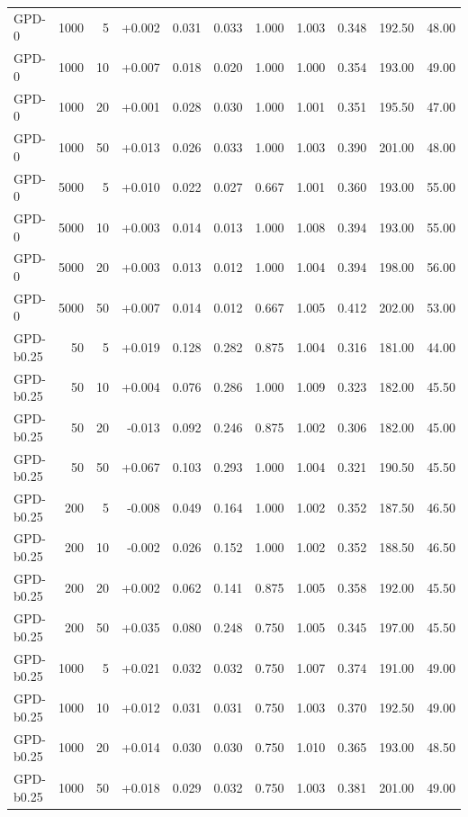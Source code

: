 \begin{table}[t]
\begin{tabular}{lrrrrrrrrrr}
GPD-0 & 1000 &    5 & +0.002 & 0.031 & 0.033 & 1.000 & 1.003 & 0.348 & 192.50 & 48.00 \\
GPD-0 & 1000 &   10 & +0.007 & 0.018 & 0.020 & 1.000 & 1.000 & 0.354 & 193.00 & 49.00 \\
GPD-0 & 1000 &   20 & +0.001 & 0.028 & 0.030 & 1.000 & 1.001 & 0.351 & 195.50 & 47.00 \\
GPD-0 & 1000 &   50 & +0.013 & 0.026 & 0.033 & 1.000 & 1.003 & 0.390 & 201.00 & 48.00 \\
GPD-0 & 5000 &    5 & +0.010 & 0.022 & 0.027 & 0.667 & 1.001 & 0.360 & 193.00 & 55.00 \\
GPD-0 & 5000 &   10 & +0.003 & 0.014 & 0.013 & 1.000 & 1.008 & 0.394 & 193.00 & 55.00 \\
GPD-0 & 5000 &   20 & +0.003 & 0.013 & 0.012 & 1.000 & 1.004 & 0.394 & 198.00 & 56.00 \\
GPD-0 & 5000 &   50 & +0.007 & 0.014 & 0.012 & 0.667 & 1.005 & 0.412 & 202.00 & 53.00 \\
GPD-b0.25 &   50 &    5 & +0.019 & 0.128 & 0.282 & 0.875 & 1.004 & 0.316 & 181.00 & 44.00 \\
GPD-b0.25 &   50 &   10 & +0.004 & 0.076 & 0.286 & 1.000 & 1.009 & 0.323 & 182.00 & 45.50 \\
GPD-b0.25 &   50 &   20 & -0.013 & 0.092 & 0.246 & 0.875 & 1.002 & 0.306 & 182.00 & 45.00 \\
GPD-b0.25 &   50 &   50 & +0.067 & 0.103 & 0.293 & 1.000 & 1.004 & 0.321 & 190.50 & 45.50 \\
GPD-b0.25 &  200 &    5 & -0.008 & 0.049 & 0.164 & 1.000 & 1.002 & 0.352 & 187.50 & 46.50 \\
GPD-b0.25 &  200 &   10 & -0.002 & 0.026 & 0.152 & 1.000 & 1.002 & 0.352 & 188.50 & 46.50 \\
GPD-b0.25 &  200 &   20 & +0.002 & 0.062 & 0.141 & 0.875 & 1.005 & 0.358 & 192.00 & 45.50 \\
GPD-b0.25 &  200 &   50 & +0.035 & 0.080 & 0.248 & 0.750 & 1.005 & 0.345 & 197.00 & 45.50 \\
GPD-b0.25 & 1000 &    5 & +0.021 & 0.032 & 0.032 & 0.750 & 1.007 & 0.374 & 191.00 & 49.00 \\
GPD-b0.25 & 1000 &   10 & +0.012 & 0.031 & 0.031 & 0.750 & 1.003 & 0.370 & 192.50 & 49.00 \\
GPD-b0.25 & 1000 &   20 & +0.014 & 0.030 & 0.030 & 0.750 & 1.010 & 0.365 & 193.00 & 48.50 \\
GPD-b0.25 & 1000 &   50 & +0.018 & 0.029 & 0.032 & 0.750 & 1.003 & 0.381 & 201.00 & 49.00 \\

\end{tabular}
\end{table}
